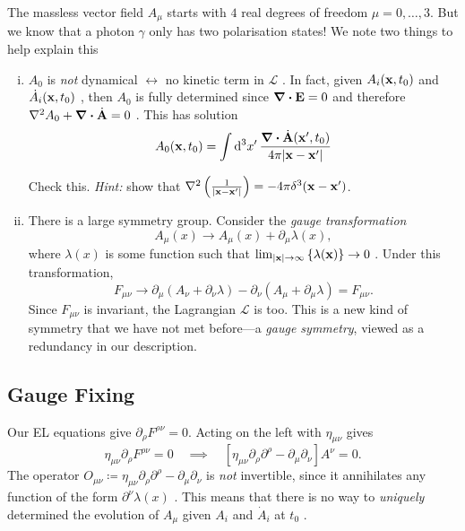 The massless vector field $A_{\mu}$  starts with $4$ real degrees of freedom  $\mu = 0, \dots, 3$. But we know that a photon $\gamma$  only has two polarisation states!
We note two things to help explain this
\begin{enumerate}[i)]
  \item $A_0$ is \emph{not} dynamical $\leftrightarrow$ no kinetic term in $\mathcal{L}$ .
    In fact, given $A_{i} (\vb{x}, t_0)$ and $\dot{A}_{i} (\vb{x}, t_0)$ , then $A_0$  is fully determined since $\div \vb{E} =0$ and therefore $\laplacian A_0 + \div \dot{\vb{A}} = 0$ . This has solution
    \begin{equation}
      \label{eq:19-dagger}
      A_0(\vb{x}, t_0) = \int \dd[3]{x'} \frac{\div \dot{\vb{A}} (\vb{x}', t_0)}{4\pi \abs{\vb{x} - \vb{x}'}}
    \end{equation}
    \begin{exercise}
      Check this. \emph{Hint:} show that $\laplacian \left( \frac{1}{\abs{\vb{x} - \vb{x}'}} \right) = - 4\pi \delta^3 (\vb{x} - \vb{x}')$.
    \end{exercise}
    \item There is a large symmetry group. Consider the \emph{gauge transformation}
      \begin{equation}
	A_{\mu}(x) \to A_{\mu}(x) + \partial_{\mu} \lambda(x),
      \end{equation}
      where $\lambda(x)$ is some function such that  $\lim_{\abs{\vb{x}} \to \infty} \left\{ \lambda(\vb{x}) \right\} \to 0$ .
      Under this transformation, 
      \begin{equation}
	F_{\mu\nu} \to \partial_{\mu} (A_{\nu} + \partial_{\nu} \lambda) - \partial_{\nu} (A_{\mu} + \partial_{\mu} \lambda) = F_{\mu\nu}.
      \end{equation}
      Since $F_{\mu\nu}$ is invariant, the Lagrangian $\mathcal{L}$ is too.
      This is a new kind of symmetry that we have not met before---a \emph{gauge symmetry}, viewed as a redundancy in our description.
\end{enumerate}

\subsection{Gauge Fixing}%
\label{sub:gauge_fixing}

Our EL equations give $\partial_{\rho} F^{\rho\nu} = 0$. Acting on the left with $\eta_{\mu\nu}$ gives
\begin{equation}
  \eta_{\mu\nu} \partial_{\rho} F^{\rho\nu} = 0 \quad \implies \quad [\eta_{\mu\nu} \partial_{\rho} \partial^{\rho} - \partial_{\mu} \partial_{\nu}] A^{\nu}= 0.
\end{equation}
The operator $O_{\mu\nu} \coloneqq \eta_{\mu\nu} \partial_{\rho} \partial^{\rho} - \partial_{\mu} \partial_{\nu}$  is \emph{not} invertible, since it annihilates any function of the form $\partial^{\nu} \lambda(x)$ . This means that there is no way to \emph{uniquely} determined the evolution of $A_{\mu}$  given $A_{i}$ and $\dot A_{i}$  at $t_0$ .

